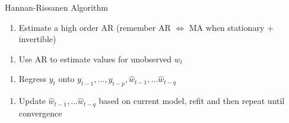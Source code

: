 \documentclass[11pt,ignorenonframetext,]{beamer}
\providecommand{\tightlist}{%
  \setlength{\itemsep}{0pt}\setlength{\parskip}{0pt}}
\begin{document}
\begin{frame}[t]{Hannan-Rissanen Algorithm}

\begin{enumerate}
\def\labelenumi{\arabic{enumi}.}
\tightlist
\item
  Estimate a high order AR (remember AR \(\Leftrightarrow\) MA when
  stationary + invertible)
\end{enumerate}

\vspace{5mm}

\begin{enumerate}
\def\labelenumi{\arabic{enumi}.}
\setcounter{enumi}{1}
\tightlist
\item
  Use AR to estimate values for unobserved \(w_t\)
\end{enumerate}

\vspace{5mm}

\begin{enumerate}
\def\labelenumi{\arabic{enumi}.}
\setcounter{enumi}{2}
\tightlist
\item
  Regress \(y_t\) onto
  \(y_{t-1}, \ldots, y_{t-p}, \hat{w}_{t-1}, \ldots \hat{w}_{t-q}\)
\end{enumerate}

\vspace{5mm}

\begin{enumerate}
\def\labelenumi{\arabic{enumi}.}
\setcounter{enumi}{3}
\tightlist
\item
  Update \(\hat{w}_{t-1}, \ldots \hat{w}_{t-q}\) based on current model,
  refit and then repeat until convergence
\end{enumerate}

\end{frame}
\end{document}

